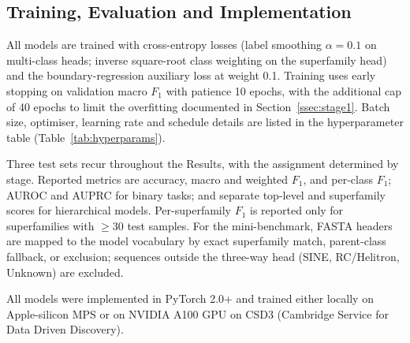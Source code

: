 \documentclass[12pt]{article}
\begin{document}
\subsection{Training, Evaluation and Implementation}\label{ssec:training}

All models are trained with cross-entropy losses (label smoothing $\alpha = 0.1$ on multi-class heads; inverse square-root class weighting on the superfamily head) and the boundary-regression auxiliary loss at weight 0.1. Training uses early stopping on validation macro $F_1$ with patience 10 epochs, with the additional cap of 40 epochs to limit the overfitting documented in Section~\ref{ssec:stage1}. Batch size, optimiser, learning rate and schedule details are listed in the hyperparameter table (Table~\ref{tab:hyperparams}). 

Three test sets recur throughout the Results, with the assignment determined by stage. Reported metrics are accuracy, macro and weighted $F_1$, and per-class $F_1$; AUROC and AUPRC for binary tasks; and separate top-level and superfamily scores for hierarchical models. Per-superfamily $F_1$ is reported only for superfamilies with $\geq$30 test samples. For the mini-benchmark, FASTA headers are mapped to the model vocabulary by exact superfamily match, parent-class fallback, or exclusion; sequences outside the three-way head (SINE, RC/Helitron, Unknown) are excluded.

All models were implemented in PyTorch 2.0+ and trained either locally on Apple-silicon MPS or on NVIDIA A100 GPU on CSD3 (Cambridge Service for Data Driven Discovery). 
\end{document}

